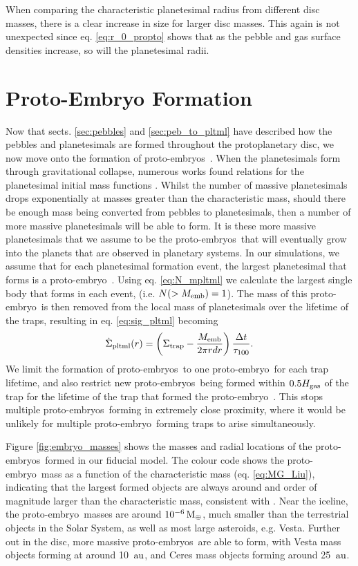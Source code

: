 \documentclass[a4paper,fleqn,usenatbib]{mnras}
\newcommand{\me}{{\, {\rm M}_{\oplus}}}
\newcommand{\au}{{\, {\rm au}}}
\newcommand{\emb}{{{proto-embryo~}}}
\newcommand{\embs}{{{proto-embryos~}}}
\begin{document}
When comparing the characteristic planetesimal radius from different disc masses, there is a clear increase in size for larger disc masses.
This again is not unexpected since eq. \ref{eq:r_0_propto} shows that as the pebble and gas surface densities increase, so will the planetesimal radii.

\section{Proto-Embryo Formation}
\label{sec:embryos}

Now that sects. \ref{sec:pebbles} and \ref{sec:peb_to_pltml} have described how the pebbles and planetesimals are formed throughout the protoplanetary disc, we now move onto the formation of \embs.
When the planetesimals form through gravitational collapse, numerous works found relations for the planetesimal initial mass functions \citep{Johansen15,Schafer17,Abod19}.
Whilst the number of massive planetesimals drops exponentially at masses greater than the characteristic mass, should there be enough mass being converted from pebbles to planetesimals, then a number of more massive planetesimals will be able to form.
It is these more massive planetesimals that we assume to be the \embs that will eventually grow into the planets that are observed in planetary systems.
In our simulations, we assume that for each planetesimal formation event, the largest planetesimal that forms is a \emb.
Using eq. \ref{eq:N_mpltml} we calculate the largest single body that forms in each event, (i.e. $N(>M_{\rm emb})=1$).
The mass of this \emb is then removed from the local mass of planetesimals over the lifetime of the traps, resulting in eq. \ref{eq:sig_pltml} becoming
\begin{equation}
\label{eq:sig_pltml2}
    \dot{\Sigma}_{\rm pltml}(r) = \left(\Sigma_{\rm trap}-\frac{M_{\rm emb}}{2\pi r dr}\right)\dfrac{\Delta t}{\tau_{100}}.
\end{equation}
We limit the formation of \embs to one \emb for each trap lifetime, and also restrict new \embs being formed within $0.5 H_{\rm gas}$ of the trap for the lifetime of the trap that formed the \emb.
This stops multiple \embs forming in extremely close proximity, where it would be unlikely for multiple \emb forming traps to arise simultaneously.

Figure \ref{fig:embryo_masses} shows the masses and radial locations of the \embs formed in our fiducial model.
The colour code shows the \emb mass as a function of the characteristic mass (eq. \ref{eq:MG_Liu}), indicating that the largest formed objects are always around and order of magnitude larger than the characteristic mass, consistent with \citet{Abod19}.
Near the iceline, the \emb masses are around $10^{-6} \me$, much smaller than the terrestrial objects in the Solar System, as well as most large asteroids, e.g. Vesta.
Further out in the disc, more massive \embs are able to form, with Vesta mass objects forming at around 10 $\au$, and Ceres mass objects forming around 25 $\au$.
\end{document}
